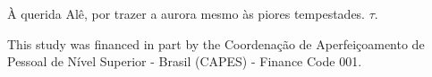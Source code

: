 \begin{agradecimentos}
À querida Alê, por trazer a aurora mesmo às piores tempestades. $\tau$.


\vfill

This study was financed in part by the Coordenação de Aperfeiçoamento de Pessoal de Nível Superior - Brasil (CAPES) - Finance Code 001.

\end{agradecimentos}
% 
